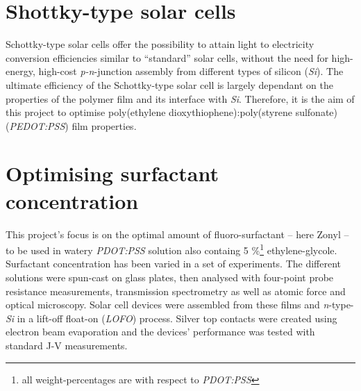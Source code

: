 \documentclass[a4paper,10pt]{article}
\begin{document}
\section*{Shottky-type solar cells}
Schottky-type solar cells offer the possibility to attain light to electricity conversion efficiencies similar to ``standard'' solar cells, without the need for high-energy, high-cost \emph{p-n}-junction assembly from different types of silicon (\emph{Si}). The ultimate efficiency of the Schottky-type solar cell is largely dependant on the properties of the polymer film and its interface with \emph{Si}. Therefore, it is the aim of this project to optimise poly(ethylene dioxythiophene):poly(styrene sulfonate) (\emph{PEDOT:PSS}) film properties. %
\section*{Optimising surfactant concentration}
This project's focus is on the optimal amount of fluoro-surfactant -- here Zonyl\textsuperscript{\textregistered} -- to be used in watery \emph{PDOT:PSS} solution also containg 5 \%\footnote{all weight-percentages are with respect to \emph{PDOT:PSS}} ethylene-glycole. Surfactant concentration has been varied in a set of experiments. The different solutions were spun-cast on glass plates, then analysed with four-point probe resistance measurements, transmission spectrometry as well as atomic force and optical microscopy. Solar cell devices were assembled from these films and \emph{n}-type-\emph{Si} in a lift-off float-on (\emph{LOFO}) process. Silver top contacts were created using electron beam evaporation and the devices' performance was tested with standard J-V measurements.
\end{document}
